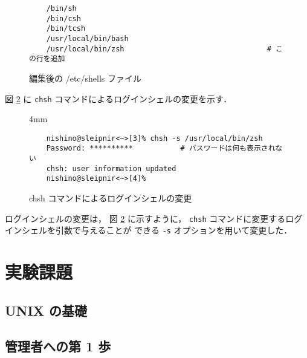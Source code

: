 \documentclass[a4j]{jreport}
\begin{document}
\begin{enumerate}[labelindent=\parindent, leftmargin=*, label=課題 \arabic*）]
\begin{figure}[H]
\begin{framed}
\begin{verbatim}
	/bin/sh
	/bin/csh
	/bin/tcsh
	/usr/local/bin/bash
	/usr/local/bin/zsh                                 # この行を追加
	      \end{verbatim}
	      \vspace*{-18pt}
	    \end{framed}
	    \vspace*{-0.3cm}
	    \caption{編集後の /etc/shells ファイル}
	    \label{Figure: 編集後の /etc/shells ファイル}
	\end{figure}

	図 \ref{Figure: chsh コマンドによるログインシェルの変更} に
	\texttt{chsh} コマンドによるログインシェルの変更を示す．

	  \begin{figure}[H]
	    \centering
	      \begin{screen}[3]
	        \setlength{\baselineskip} {4mm}
	        \begin{verbatim}
	nishino@sleipnir<~>[3]% chsh -s /usr/local/bin/zsh
	Password: **********           # パスワードは何も表示されない
	chsh: user information updated
	nishino@sleipnir<~>[4]%
	        \end{verbatim}
	        \vspace*{-18pt}
	      \end{screen}
	      \caption{chsh コマンドによるログインシェルの変更}
	      \label{Figure: chsh コマンドによるログインシェルの変更}
	  \end{figure}

	ログインシェルの変更は，
	図 \ref{Figure: chsh コマンドによるログインシェルの変更} に示すように，
	\texttt{chsh} コマンドに変更するログインシェルを引数で与えることが
	できる \texttt{-s} オプションを用いて変更した．

\end{enumerate}

%	
%
\chapter{実験課題}

\section{UNIX の基礎}


\newpage				%
\section{管理者への第 1 歩}
\end{document}
